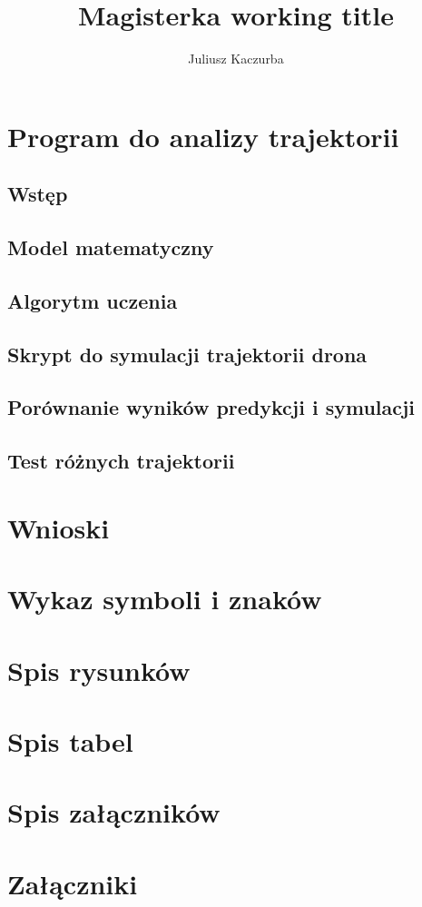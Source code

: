 \documentclass[12pt, a4paper]{article}
\title{Magisterka working title}
\author{Juliusz Kaczurba}
\begin{document}
	\maketitle
    \thispagestyle{empty}
	\newpage
    
    
	\tableofcontents
    \setcounter{page}{1}
	\newpage
    
	
    
	

    \section{Program do analizy trajektorii}
        \subsection{Wstęp}
        \subsection{Model matematyczny}
        
        \subsection{Algorytm uczenia}
        \subsection{Skrypt do symulacji trajektorii drona}
        \subsection{Porównanie wyników predykcji i symulacji}
        \subsection{Test różnych trajektorii}

    \section{Wnioski}

    \newpage
    \printbibliography
    
    \newpage
    \section{Wykaz symboli i znaków}
    
    \newpage
    \section{Spis rysunków}
    
    \newpage
    \section{Spis tabel}
    
    \newpage
    \section{Spis załączników}
    
    \newpage
    \section{Załączniki}
	
\end{document}
